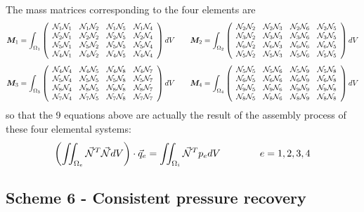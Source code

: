 The mass matrices corresponding to the four elements are 
\[
{\bm M}_1 = \int_{\Omega_1} \left( \begin{array}{cccc}
 \bN_1 \bN_1 & \bN_1 \bN_2 & \bN_1 \bN_5 & \bN_1 \bN_4 \\
 \bN_2 \bN_1 & \bN_2 \bN_2 & \bN_2 \bN_5 & \bN_2 \bN_4 \\
 \bN_5 \bN_1 & \bN_5 \bN_2 & \bN_5 \bN_5 & \bN_5 \bN_4 \\
 \bN_4 \bN_1 & \bN_4 \bN_2 & \bN_4 \bN_5 & \bN_4 \bN_4 
\end{array}\right) dV
\qquad
{\bm M}_2 = \int_{\Omega_2} \left( \begin{array}{cccc}
 \bN_2 \bN_2 & \bN_2 \bN_3 & \bN_2 \bN_6 & \bN_2 \bN_5 \\
 \bN_3 \bN_2 & \bN_3 \bN_3 & \bN_3 \bN_6 & \bN_3 \bN_5 \\
 \bN_6 \bN_2 & \bN_6 \bN_3 & \bN_6 \bN_6 & \bN_6 \bN_5 \\
 \bN_5 \bN_2 & \bN_5 \bN_3 & \bN_5 \bN_6 & \bN_5 \bN_5 
\end{array}\right) dV
\]
\[
{\bm M}_3 = \int_{\Omega_3} \left( \begin{array}{cccc}
 \bN_4 \bN_4 & \bN_4 \bN_5 & \bN_4 \bN_8 & \bN_4 \bN_7 \\
 \bN_5 \bN_4 & \bN_5 \bN_5 & \bN_5 \bN_8 & \bN_5 \bN_7 \\
 \bN_8 \bN_4 & \bN_8 \bN_5 & \bN_8 \bN_8 & \bN_8 \bN_7 \\
 \bN_7 \bN_4 & \bN_7 \bN_5 & \bN_7 \bN_8 & \bN_7 \bN_7 
\end{array}\right) dV
\qquad
{\bm M}_4 = \int_{\Omega_4} \left( \begin{array}{cccc}
 \bN_5 \bN_5 & \bN_5 \bN_6 & \bN_5 \bN_9 & \bN_5 \bN_8 \\
 \bN_6 \bN_5 & \bN_6 \bN_6 & \bN_6 \bN_9 & \bN_6 \bN_8 \\
 \bN_9 \bN_5 & \bN_9 \bN_6 & \bN_9 \bN_9 & \bN_9 \bN_8 \\
 \bN_8 \bN_5 & \bN_8 \bN_6 & \bN_8 \bN_9 & \bN_8 \bN_8 
\end{array}\right) dV
\]
so that the 9 equations above are actually the result of the assembly process of these four 
elemental systems:
\[
\left( \iint_{\Omega_e} \vec{\bN}^T\vec{\bN} dV \right) \cdot \vec{q}_e = \iint_{\Omega_i} \vec{\bN}^T p_e dV 
\qquad\qquad e=1,2,3,4
\]


\subsection{Scheme 6 - Consistent pressure recovery \label{ss:cpr}}

